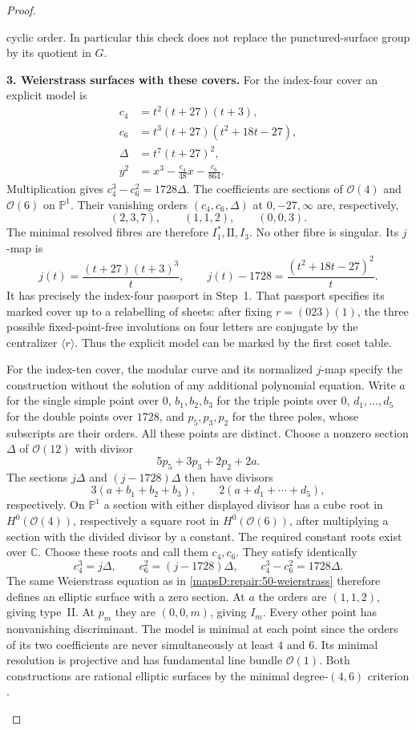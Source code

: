 \begin{proof}
\begin{enumerate}[label=\arabic*.,leftmargin=*]
cyclic order.  In particular this check does not replace the
punctured-surface group by its quotient in $G$.
\par\medskip\noindent\textbf{3. Weierstrass surfaces with these covers.}\quad 
For the index-four cover an explicit model is
\begin{equation}\label{mapsD:repair:50-weierstrass}
\begin{split}
 c_4&=t^2(t+27)(t+3),\\
 c_6&=t^3(t+27)(t^2+18t-27),\\
 \Delta&=t^7(t+27)^2,\\
 y^2&=x^3-\frac{c_4}{48}x-\frac{c_6}{864}.
\end{split}
\end{equation}
Multiplication gives $c_4^3-c_6^2=1728\Delta$.  The coefficients
are sections of $\mathcal O(4)$ and $\mathcal O(6)$ on
$\mathbb P^1$.  Their vanishing orders $(c_4,c_6,\Delta)$ at
$0,-27,\infty$ are, respectively,
\[
 (2,3,7),\qquad(1,1,2),\qquad(0,0,3).
\]
The minimal resolved fibres are therefore $I_1^*,\mathrm{II},I_3$.
No other fibre is singular.  Its $j$-map is
\[
 j(t)=\frac{(t+27)(t+3)^3}{t},\qquad
 j(t)-1728=\frac{(t^2+18t-27)^2}{t}.
\]
It has precisely the index-four passport in Step~1.  That passport
specifies its marked cover up to a relabelling of sheets: after
fixing $r=(023)(1)$, the three possible fixed-point-free involutions
on four letters are conjugate by the centralizer $\langle r\rangle$.
Thus the explicit model can be marked by the first coset table.

For the index-ten cover, the modular curve and its normalized
$j$-map specify the construction without the solution of any
additional polynomial equation.  Write $a$ for the single simple
point over $0$, $b_1,b_2,b_3$ for the triple points over $0$,
$d_1,\ldots,d_5$ for the double points over $1728$, and
$p_5,p_3,p_2$ for the three poles, whose subscripts are their orders.
All these points are distinct.  Choose a nonzero section
$\Delta$ of $\mathcal O(12)$ with divisor
\[
 5p_5+3p_3+2p_2+2a.
\]
The sections $j\Delta$ and $(j-1728)\Delta$ then have divisors
\[
 3(a+b_1+b_2+b_3),\qquad
 2(a+d_1+\cdots+d_5),
\]
respectively.  On $\mathbb P^1$ a section with either displayed
divisor has a cube root in $H^0(\mathcal O(4))$, respectively a
square root in $H^0(\mathcal O(6))$, after multiplying a section
with the divided divisor by a constant.  The required constant
roots exist over $\mathbb C$.  Choose these roots and call them
$c_4,c_6$.  They satisfy identically
\[
 c_4^3=j\Delta,\qquad c_6^2=(j-1728)\Delta,
 \qquad c_4^3-c_6^2=1728\Delta.
\]
The same Weierstrass equation as in
\eqref{mapsD:repair:50-weierstrass} therefore defines an elliptic
surface with a zero section.  At $a$ the orders are $(1,1,2)$,
giving type~II.  At $p_m$ they are $(0,0,m)$, giving $I_m$.
Every other point has nonvanishing discriminant.  The model is
minimal at each point since the orders of its two coefficients
are never simultaneously at least $4$ and $6$.  Its minimal
resolution is projective and has fundamental line bundle
$\mathcal O(1)$.  Both constructions are rational elliptic
surfaces by the minimal degree-$(4,6)$ criterion
\cite[\S8.2--8.4, pp.~38--39]{manSS10}.


\end{enumerate}
\end{proof}
